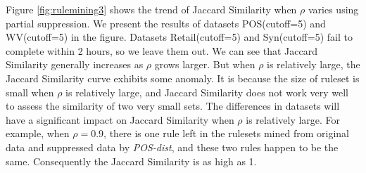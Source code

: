 Figure \ref{fig:rulemining3} shows the trend of Jaccard Similarity when $\rho$ varies using partial suppression.
We present the results of datasets POS(cutoff=5) and WV(cutoff=5) in the figure.
Datasets Retail(cutoff=5) and Syn(cutoff=5) fail to complete within 2 hours, so we leave them out.
We can see that Jaccard Similarity generally increases as $\rho$ grows larger.
But when $\rho$ is relatively large, the Jaccard Similarity curve
exhibits some anomaly. It is because
the size of ruleset is small when $\rho$ is relatively large,
and Jaccard Similarity does not work very well to assess
the similarity of two very small sets.
The differences in datasets will have a significant impact on
Jaccard Similarity when $\rho$ is
relatively large.
For example, when $\rho=0.9$,
there is one rule left in the rulesets mined from
original data and suppressed data by {\em POS-dist}, and
these two rules happen to be the same.
Consequently the Jaccard Similarity is as high as 1.

